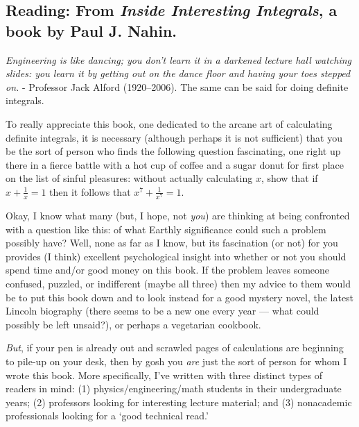 


\subsection*{Reading: From \textit{Inside Interesting Integrals}, a book by Paul J. Nahin.}
\begin{center}
  \textit{Engineering is like dancing; you don’t learn it in a darkened lecture hall watching slides: you learn it by getting out on the dance floor and having your toes stepped on.} - Professor Jack Alford (1920–2006). The same can be said for doing definite integrals.
\end{center}

To really appreciate this book, one dedicated to the arcane art of calculating
definite integrals, it is necessary (although perhaps it is not sufficient) that you be
the sort of person who finds the following question fascinating, one right up there in
a fierce battle with a hot cup of coffee and a sugar donut for first place on the list of
sinful pleasures: without actually calculating $x$, show that if $ x + \frac{1}{x} = 1 $
then it follows that $ x^7 + \frac{1}{x^7} = 1 $.

Okay, I know what many (but, I hope, not \textit{you}) are thinking at being confronted
with a question like this: of what Earthly significance could such a problem possibly
have? Well, none as far as I know, but its fascination (or not) for
you provides (I think) excellent psychological insight into whether or not
you should spend time and/or good money on this book. If the problem leaves someone confused, puzzled,
or indifferent (maybe all three) then my advice to them would be to put this book
down and to look instead for a good mystery novel, the latest Lincoln biography
(there seems to be a new one every year --- what could
possibly be left unsaid?), or perhaps a vegetarian cookbook.

\textit{But}, if your pen is already out and scrawled pages of calculations are beginning
to pile-up on your desk, then by gosh you \textit{are} just the sort of person for whom I
wrote this book. More specifically, I’ve written with three distinct types of
readers in mind: (1) physics/engineering/math students in their undergraduate
years; (2) professors looking for interesting lecture material; and (3) nonacademic
professionals looking for a ‘good technical read.’

